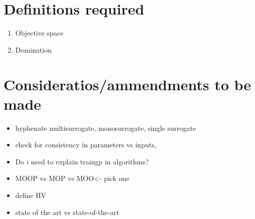 \documentclass[runningheads]{llncs}
\begin{document}
\section{Definitions required}
\begin{enumerate}
    \item Objective space
    \item Domination
\end{enumerate}


\section{Consideratios/ammendments to be made}
\begin{itemize}
    \item hyphenate multisurrogate, monosurrogate, single surrogate
    \item check for consistency in parameters vs inputs, 
    \item Do i need to explain traingp in algorithms?
    \item MOOP vs MOP vs MOO<- pick one
    \item define HV
    \item state of the art vs state-of-the-art
\end{itemize}

\clearpage


\end{document}
